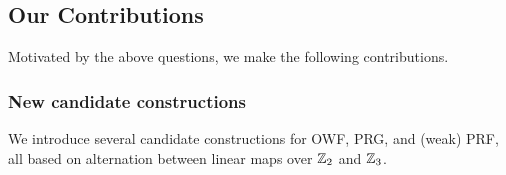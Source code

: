 
\subsection{Our Contributions}


Motivated by the above questions, we make the following contributions.

\iffalse
\paragraph{\bf \textnormal{OT} and \textnormal{VOLE} friendliness}.
    MPC protocols in the preprocessing model can take advantage of input-independent correlated randomness to better handle nonlinear gates~\cite{Beaver,BDOZ,SPDZ,PowerOfCorrelatedRandomness,TinyTables,BGI19}. However, some kinds of correlated randomness are better than other. Recent work~\cite{?} for instance, has shown how pseudorandom correlation generators (PCGs) can be used to generate millions of ``OT'' and ``VOLE'' correlations with very low and computation costs. Furthermore, it is not necessary to store all of these correlations; they can stored in a compressed form, and expanded only when needed~\cite{?}. Roughly speaking, an OT correlation is useful for evaluating a ``simple'' nonlinear gates (such as Boolean AND) and a VOLE correlation is useful for scalar-vector products. We would like to maximize the potential benefit from these recent techniques.


\mahimna{still writing}
\fi


\subsubsection{New candidate constructions}
We introduce several candidate constructions for OWF, PRG, and (weak) PRF, all based on alternation between linear maps over $\mathbb{Z}_2$ and $\mathbb{Z}_3$.

